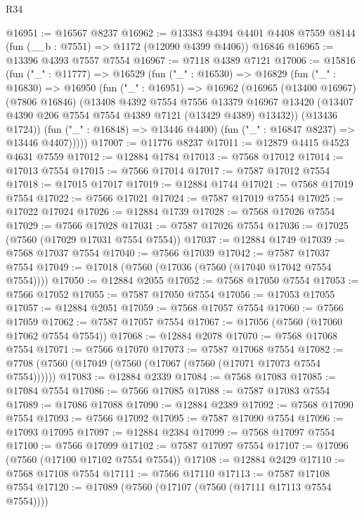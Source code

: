 \begin{lexlean}{R34}
\begin{coremodule}
@16951 := @16567 @8237
@16962 := @13383
    @4394
    @4401
    @4408
    @7559
    @8144
    (fun (__b : @7551) => @1172 (@12090 @4399 @4406))
    @16846
@16965 := @13396 @4393 @7557 @7554
@16967 := @7118 @4389 @7121
@17006 := @15816
    (fun ("_" : @11777) =>
    @16529
      (fun ("_" : @16530) =>
      @16829
        (fun ("_" : @16830) =>
        @16950
          (fun ("_" : @16951) =>
          @16962
            (@16965
              (@13400 @16967)
              (@7806 @16846)
              (@13408
                @4392
                @7554
                @7556
                @13379
                @16967
                @13420
                (@13407 @4390 @206 @7554 @7554 @4389 @7121 (@13429 @4389) @13432))
              (@13436 @1724))
            (fun ("_" : @16848) => @13446 @4400)
            (fun ("_" : @16847 @8237) => @13446 @4407)))))
@17007 := @11776 @8237
@17011 := @12879 @4415 @4523 @4631 @7559
@17012 := @12884 @1784
@17013 := @7568 @17012
@17014 := @17013 @7554
@17015 := @7566 @17014
@17017 := @7587 @17012 @7554
@17018 := @17015 @17017
@17019 := @12884 @1744
@17021 := @7568 @17019 @7554
@17022 := @7566 @17021
@17024 := @7587 @17019 @7554
@17025 := @17022 @17024
@17026 := @12884 @1739
@17028 := @7568 @17026 @7554
@17029 := @7566 @17028
@17031 := @7587 @17026 @7554
@17036 := @17025 (@7560 (@17029 @17031 @7554 @7554))
@17037 := @12884 @1749
@17039 := @7568 @17037 @7554
@17040 := @7566 @17039
@17042 := @7587 @17037 @7554
@17049 := @17018 (@7560 (@17036 (@7560 (@17040 @17042 @7554 @7554))))
@17050 := @12884 @2055
@17052 := @7568 @17050 @7554
@17053 := @7566 @17052
@17055 := @7587 @17050 @7554
@17056 := @17053 @17055
@17057 := @12884 @2051
@17059 := @7568 @17057 @7554
@17060 := @7566 @17059
@17062 := @7587 @17057 @7554
@17067 := @17056 (@7560 (@17060 @17062 @7554 @7554))
@17068 := @12884 @2078
@17070 := @7568 @17068 @7554
@17071 := @7566 @17070
@17073 := @7587 @17068 @7554
@17082 := @7708 (@7560 (@17049 (@7560 (@17067 (@7560 (@17071 @17073 @7554 @7554))))))
@17083 := @12884 @2339
@17084 := @7568 @17083
@17085 := @17084 @7554
@17086 := @7566 @17085
@17088 := @7587 @17083 @7554
@17089 := @17086 @17088
@17090 := @12884 @2389
@17092 := @7568 @17090 @7554
@17093 := @7566 @17092
@17095 := @7587 @17090 @7554
@17096 := @17093 @17095
@17097 := @12884 @2384
@17099 := @7568 @17097 @7554
@17100 := @7566 @17099
@17102 := @7587 @17097 @7554
@17107 := @17096 (@7560 (@17100 @17102 @7554 @7554))
@17108 := @12884 @2429
@17110 := @7568 @17108 @7554
@17111 := @7566 @17110
@17113 := @7587 @17108 @7554
@17120 := @17089 (@7560 (@17107 (@7560 (@17111 @17113 @7554 @7554))))

\end{coremodule}
\end{lexlean}
